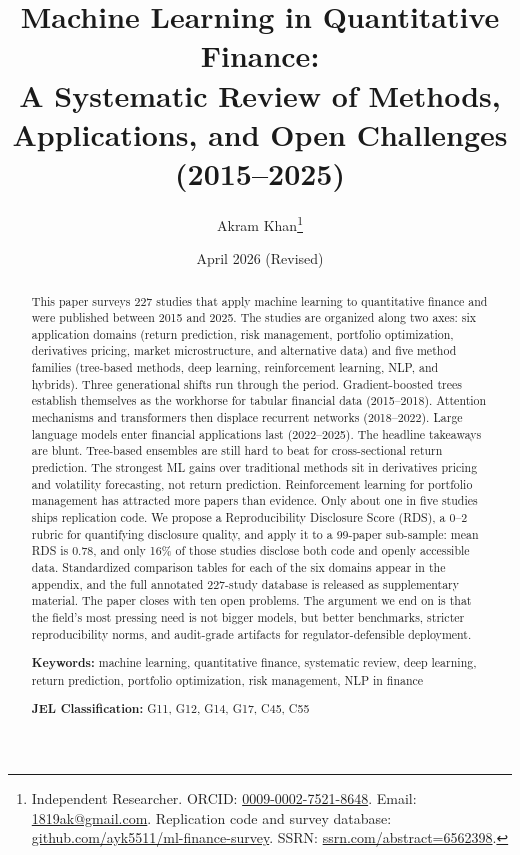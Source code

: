 \documentclass[12pt,a4paper]{article}
\title{Machine Learning in Quantitative Finance:\\A Systematic Review of Methods, Applications, and Open Challenges (2015--2025)}
\author{
    Akram Khan\thanks{Independent Researcher. ORCID: \href{https://orcid.org/0009-0002-7521-8648}{0009-0002-7521-8648}. Email: \href{mailto:1819ak@gmail.com}{1819ak@gmail.com}. Replication code and survey database: \href{https://github.com/ayk5511/ml-finance-survey}{github.com/ayk5511/ml-finance-survey}. SSRN: \href{https://ssrn.com/abstract=6562398}{ssrn.com/abstract=6562398}.}
}
\date{April 2026 (Revised)}
\begin{document}
\maketitle

\begin{abstract}
This paper surveys 227 studies that apply machine learning to quantitative finance and were published between 2015 and 2025. The studies are organized along two axes: six application domains (return prediction, risk management, portfolio optimization, derivatives pricing, market microstructure, and alternative data) and five method families (tree-based methods, deep learning, reinforcement learning, NLP, and hybrids). Three generational shifts run through the period. Gradient-boosted trees establish themselves as the workhorse for tabular financial data (2015--2018). Attention mechanisms and transformers then displace recurrent networks (2018--2022). Large language models enter financial applications last (2022--2025). The headline takeaways are blunt. Tree-based ensembles are still hard to beat for cross-sectional return prediction. The strongest ML gains over traditional methods sit in derivatives pricing and volatility forecasting, not return prediction. Reinforcement learning for portfolio management has attracted more papers than evidence. Only about one in five studies ships replication code. We propose a Reproducibility Disclosure Score (RDS), a 0--2 rubric for quantifying disclosure quality, and apply it to a 99-paper sub-sample: mean RDS is 0.78, and only 16\% of those studies disclose both code and openly accessible data. Standardized comparison tables for each of the six domains appear in the appendix, and the full annotated 227-study database is released as supplementary material. The paper closes with ten open problems. The argument we end on is that the field's most pressing need is not bigger models, but better benchmarks, stricter reproducibility norms, and audit-grade artifacts for regulator-defensible deployment.

\medskip
\noindent\textbf{Keywords:} machine learning, quantitative finance, systematic review, deep learning, return prediction, portfolio optimization, risk management, NLP in finance

\medskip
\noindent\textbf{JEL Classification:} G11, G12, G14, G17, C45, C55
\end{abstract}

\newpage
\tableofcontents
\newpage


\end{document}

